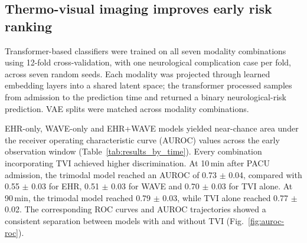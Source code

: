 \documentclass[pdflatex,sn-basic,Numbered]{sn-jnl}
\theoremstyle{thmstyleone}%
\theoremstyle{thmstyletwo}%
\theoremstyle{thmstylethree}%
\begin{document}
\clearpage

\subsection{Thermo-visual imaging improves early risk ranking}

Transformer-based classifiers were trained on all seven modality combinations using 12-fold cross-validation, with one neurological complication case per fold, across seven random seeds. Each modality was projected through learned embedding layers into a shared latent space; the transformer processed samples from admission to the prediction time and returned a binary neurological-risk prediction. VAE splits were matched across modality combinations.

EHR-only, WAVE-only and EHR+WAVE models yielded near-chance area under the receiver operating characteristic curve (AUROC) values across the early observation window (Table~\ref{tab:results_by_time}). Every combination incorporating TVI achieved higher discrimination. At 10\,min after PACU admission, the trimodal model reached an AUROC of 0.73 $\pm$ 0.04, compared with 0.55 $\pm$ 0.03 for EHR, 0.51 $\pm$ 0.03 for WAVE and 0.70 $\pm$ 0.03 for TVI alone. At 90\,min, the trimodal model reached 0.79 $\pm$ 0.03, while TVI alone reached 0.77 $\pm$ 0.02. The corresponding ROC curves and AUROC trajectories showed a consistent separation between models with and without TVI (Fig.~\ref{fig:auroc-roc}).
\end{document}
